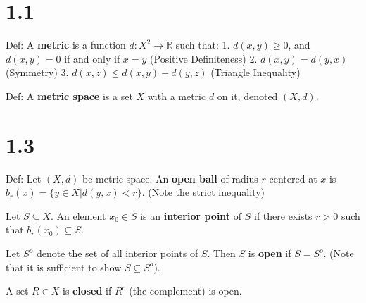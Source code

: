 \documentclass[12pt]{article}
\newcommand{\RR}{\mathbb{R}}
\renewcommand{\ss}{\subseteq}
\begin{document}
	
	
\section*{1.1}
	Def: A \textbf{metric} is a function $d:X^2\to \RR$ such that:
	1. $d(x,y)\ge 0$, and $d(x,y)=0$ if and only if $x=y$ (Positive Definiteness)
	2. $d(x,y)=d(y,x)$ (Symmetry)
	3. $d(x,z)\le d(x,y)+d(y,z)$ (Triangle Inequality)
	
	Def: A \textbf{metric space} is a set $X$ with a metric $d$ on it, denoted $(X,d)$.
	
\section*{1.3}

Def: Let $(X,d)$ be metric space. An \textbf{open ball} of radius $r$ centered at $x$  is $b_r(x)=\{y\in X| d(y,x)<r\}$. (Note the strict inequality)
	
	Let $S\ss X$. An element $x_0\in S$ is an \textbf{interior point} of $S$ if there exists $r>0$ such that $b_r(x_0)\ss S$.
	
Let $S^o$ denote the set of all interior points of $S$. Then $S$ is \textbf{open} if $S=S^o$. (Note that it is sufficient to show $S\ss S^o$).

A set $R\in X$ is \textbf{closed} if $R^c$ (the complement) is open.
\end{document}
